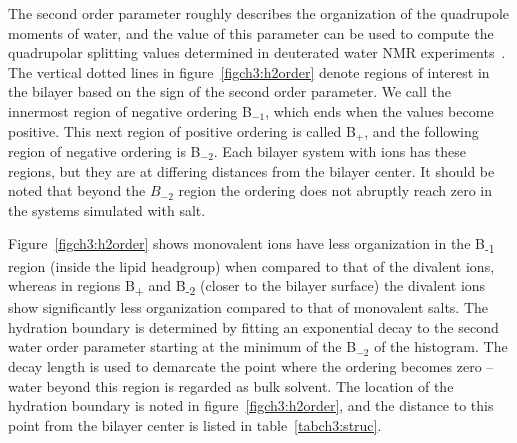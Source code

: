 The second order parameter
roughly describes the organization of the quadrupole moments of water, {and the value of this parameter
can be used to compute the} quadrupolar splitting values determined in 
deuterated water NMR experiments~\cite{aaman:2003,kruczek:2017:ether}.
The vertical dotted lines in figure~\ref{figch3:h2order} denote regions of interest in the bilayer 
based on the {sign} of the second order parameter. We call the innermost region of negative ordering
B$_{-1}$, which ends when the values become positive. This next region of positive ordering is
called B$_{+}$, and the following region of negative ordering is B$_{-2}$. Each bilayer system with ions
has these regions, but they are at differing distances from the bilayer center.
It should be noted that beyond the $B_{-2}$ region the ordering does not abruptly reach zero in the systems
simulated with salt.

{
    Figure~\ref{figch3:h2order} shows monovalent ions have 
    less organization in the B\textsubscript{-1} region (inside the lipid headgroup) when compared to that of the divalent ions,  
    whereas in regions B\textsubscript{+} and B\textsubscript{-2} (closer to the bilayer surface) the divalent ions show significantly
    less organization compared to that of monovalent salts.} 
The hydration boundary is determined by  
fitting an exponential decay to the second water order parameter starting
at the minimum of the B$_{-2}$ of the histogram.
The decay length is used to demarcate the point where the ordering becomes zero -- water beyond this region is
regarded as bulk solvent. The location of the hydration boundary 
is noted in figure~\ref{figch3:h2order}, and the distance 
to this point from the bilayer center is listed in table~\ref{tabch3:struc}.

